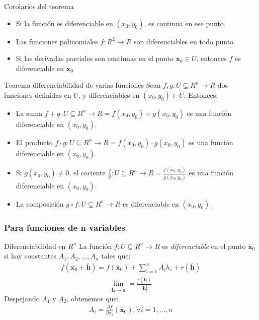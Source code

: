 \documentclass[a4paper, twoside]{article}
\numberwithin{equation}{section}
\numberwithin{figure}{section}
\numberwithin{table}{section}
\newcommand{\vect}[1]{\overline{\textbf{#1}}}
\begin{document}
\begin{corolario*}{Corolarios del teorema}
	\begin{itemize}
		\item Si la función es diferenciable en $(x_0,y_0)$, es continua en ese punto.
		\item Las funciones polinomiales $f: R^2 \rightarrow R$ son diferenciables en todo punto.
		\item Si las derivadas parciales son continuas en el punto $\vect{x}_0 \in U$, entonces $f$ es diferenciable en $\vect{x}_0$
	\end{itemize}
\end{corolario*}

\begin{teorema*}{Teorema diferenciabilidad de varias funciones}
	Sean $f,g:U\subseteq R^n \rightarrow R$ dos funciones definidas en $U$, y diferenciables en $(x_0,y_0) \in U.$ Entonces:
	\begin{itemize}
		\item La suma $f+g:U\subseteq R^n \rightarrow R=f(x_0,y_0)+g(x_0,y_0)$	es una función diferenciable en $(x_0,y_0)$.
		\item El producto $f \cdot g:U\subseteq R^n \rightarrow R=f(x_0,y_0)\cdot g(x_0,y_0)$ es una función diferenciable en $(x_0,y_0)$.
		\item Si $g(x_0,y_0) \neq 0$, el cociente $\frac{f}{g}:U\subseteq R^n \rightarrow R=\frac{f(x_0,y_0)}{g(x_0,y_0)}$ es una función diferenciable en $(x_0,y_0)$.
		\item La composición $g \circ f:U\subseteq R^n \rightarrow R$ es diferenciable en $(x_0,y_0)$.
	\end{itemize}
\end{teorema*}

\subsubsection{Para funciones de n variables} 
\begin{definicion*}{Diferenciabilidad  en $R^n$}
	La función $f:U\subseteq R^n \rightarrow R$ es \emph{diferenciable} en el punto $\vect{x}_0$ si hay constantes $A_1,A_2,...,A_n$ tales que:
	\begin{align}
		f(\vect{x}_0+\vect{h})=f(\vect{x}_0)+\sum_{i=1}^{n} A_ih_i+r(\vect{h})
	\end{align}
	\begin{align}
		\lim_{\vect{h} \to \vect{0}}=\frac{r(\vect{h})}{|\vect{h}|}
	\end{align}
	Despejando $A_1$ y $A_2$, obtenemos que:
	\begin{align}
		A_i=\frac{\partial f}{\partial x_i}(\vect{x}_0), \forall i=1,...,n
	\end{align}
\end{definicion*}
\end{document}
